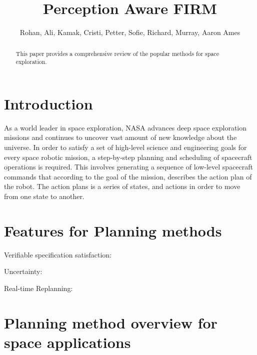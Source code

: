 \documentclass[conference]{IEEEtran}
\begin{document}

\title{\huge Perception Aware FIRM}

\author{Rohan, Ali, Kamak, Cristi, Petter, Sofie, Richard, Murray, Aaron Ames}

\maketitle

\begin{abstract}
This paper provides a comprehensive review of the popular methods for space exploration.
\end{abstract}



\section{Introduction}
As a world leader in space exploration, NASA advances deep space exploration missions and continues to uncover vast amount of new knowledge about the universe.
In order to satisfy a set of high-level science and engineering goals for every space robotic mission, a step-by-step planning and scheduling of spacecraft operations is required. This involves generating a sequence of low-level spacecraft commands that according to the goal of the mission, describes the action plan of the robot. The action plans is a series of states, and actions in order to move from one state to another.


\section{Features for Planning methods}

Verifiable specification satisfaction:

Uncertainty: 

Real-time Replanning:

\section{Planning method overview for space applications}
\end{document}
